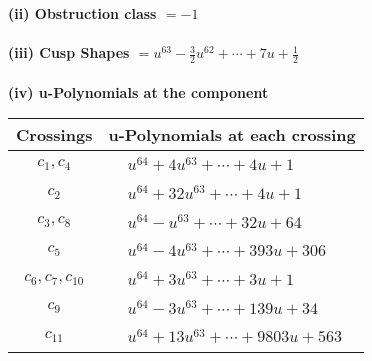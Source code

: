 \documentclass[1p]{elsarticle_modified}
\theoremstyle{definition}
\begin{document}
\flushleft \textbf{(ii) Obstruction class $= -1$}\\~\\
\flushleft \textbf{(iii) Cusp Shapes $= u^{63}-\frac{3}{2} u^{62}+\cdots+7 u+\frac{1}{2}$}\\~\\
\newpage\renewcommand{\arraystretch}{1}
\flushleft \textbf{(iv) u-Polynomials at the component}\newline \\
\begin{tabular}{m{50pt}|m{274pt}}
Crossings & \hspace{64pt}u-Polynomials at each crossing \\
\hline $$\begin{aligned}c_{1},c_{4}\end{aligned}$$&$\begin{aligned}
&u^{64}+4 u^{63}+\cdots+4 u+1
\end{aligned}$\\
\hline $$\begin{aligned}c_{2}\end{aligned}$$&$\begin{aligned}
&u^{64}+32 u^{63}+\cdots+4 u+1
\end{aligned}$\\
\hline $$\begin{aligned}c_{3},c_{8}\end{aligned}$$&$\begin{aligned}
&u^{64}- u^{63}+\cdots+32 u+64
\end{aligned}$\\
\hline $$\begin{aligned}c_{5}\end{aligned}$$&$\begin{aligned}
&u^{64}-4 u^{63}+\cdots+393 u+306
\end{aligned}$\\
\hline $$\begin{aligned}c_{6},c_{7},c_{10}\end{aligned}$$&$\begin{aligned}
&u^{64}+3 u^{63}+\cdots+3 u+1
\end{aligned}$\\
\hline $$\begin{aligned}c_{9}\end{aligned}$$&$\begin{aligned}
&u^{64}-3 u^{63}+\cdots+139 u+34
\end{aligned}$\\
\hline $$\begin{aligned}c_{11}\end{aligned}$$&$\begin{aligned}
&u^{64}+13 u^{63}+\cdots+9803 u+563
\end{aligned}$\\
\hline
\end{tabular}\\~\\
\end{document}
